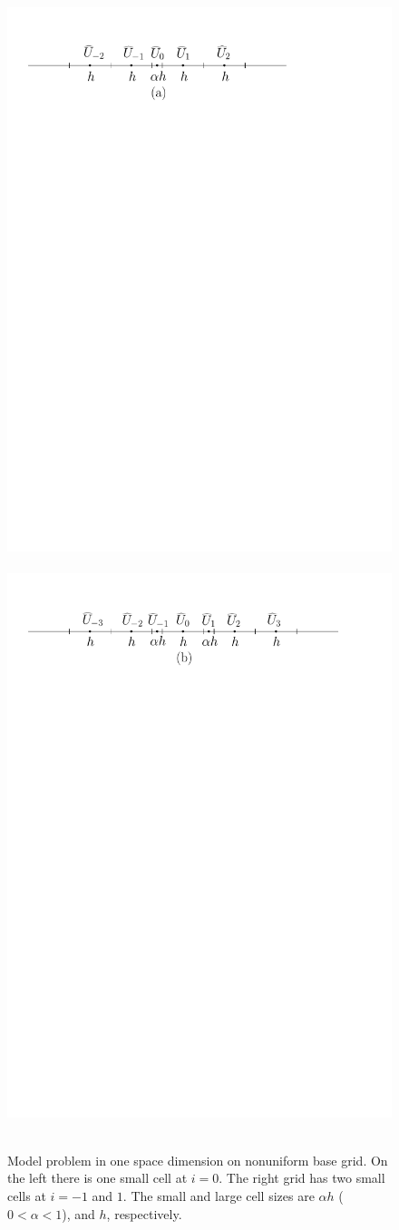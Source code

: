 \begin{figure}[h]
\centering
\vspace*{.2in}
\mbox{
\includegraphics[width=0.4\linewidth,trim=30 0 20 0,clip]{figs/overlapping_simple.pdf} 
\hspace*{.1in}
\includegraphics[width=0.5\linewidth,trim=15 0 25 0,clip]{figs/overlapping.pdf}
}
\vspace*{.1in}
\caption{\sf Model problem in one space dimension on nonuniform base grid.
On the left there is one small cell at $i=0$. The right grid has two small 
cells  at $i = -1$ and $1$.  The small and large cell 
sizes are $\alpha h$ ($0<\alpha < 1$), and $h$, respectively. \label{fig:ng1}}
\end{figure}

